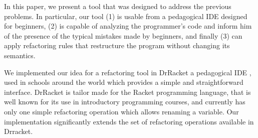 In this paper, we present a tool that was designed to address the
previous problems.  In particular, our tool (1) is usable from a
pedagogical IDE designed for beginners\cite{pears2007survey}\cite{kolling2003bluej}, (2) is capable of analyzing
the programmer's code and inform him of the presence of the typical
mistakes made by beginners, and finally (3) can apply refactoring
rules that restructure the program without changing its semantics.

We implemented our idea for a refactoring tool in DrRacket a pedagogical IDE \cite{drscheme}\cite{drscheme_pegadogy},
used in schools around the world which provides a simple and straightforward interface.
DrRacket is tailor made for the Racket programming language, that is well known for its
use in introductory programming courses, and currently has only one simple refactoring
operation which allows renaming a variable.
Our implementation significantly extends the set of refactoring operations available
in Drracket.
